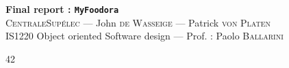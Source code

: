 \documentclass[12pt,oneside,a4paper]{article}
\begin{document}
\begin{center}
{\LARGE \bfseries 
  Final report : \texttt{MyFoodora}\\[0.1cm] 
}
{\large
  \textsc{CentraleSupélec} --- John \textsc{de Wasseige} --- Patrick \textsc{von Platen}\\[0.3cm]
}
{\normalsize
  IS1220 Object oriented Software design --- Prof. : Paolo \textsc{Ballarini} \\[0.9cm]
}
\end{center}


42 

\end{document}
